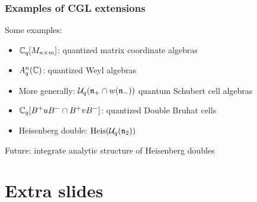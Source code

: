 \documentclass[aspectratio=169]{beamer}
\begin{document}
\begin{frame}
	\frametitle{Examples of CGL extensions}

	Some examples:
	\begin{itemize}
		\item $\mathbb{C}_q[M_{n\times m}]$: quantized matrix coordinate algebras
		\item $A^n_q(\mathbb{C})$: quantized Weyl algebras
		\item More generally: $\mathcal{U}_q(\mathfrak{n}_+ \cap w(\mathfrak{n}_-))$ quantum Schubert cell algebras
		\item $\mathbb{C}_q[B^+ u B^- \cap B^+ v B^-]$: quantized Double Bruhat cells \pause
		\item Heisenberg double: $\operatorname{Heis}(\mathcal{U}_q(\mathfrak{n}_2))$
	\end{itemize}
	\medskip
	\pause
	Future: integrate analytic structure of Heisenberg doubles

\end{frame}

\appendix

\section{Extra slides}
\end{document}
